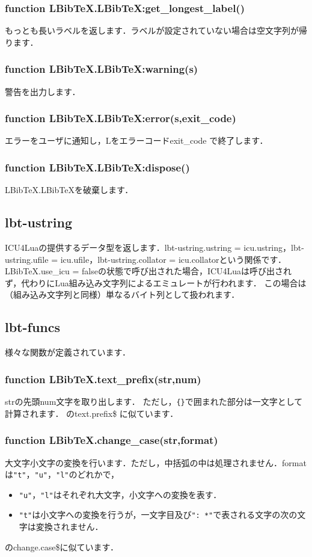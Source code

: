 \documentclass[dvipdfmx,a4paper]{jsarticle}
\DeclareRobustCommand{\LBibTeX}{L\BibTeX}
\begin{document}
\subsubsection{function LBibTeX.LBibTeX:get\_longest\_label()}
もっとも長いラベルを返します．ラベルが設定されていない場合は空文字列が帰ります．

\subsubsection{function LBibTeX.LBibTeX:warning(s)}
警告を出力します．

\subsubsection{function LBibTeX.LBibTeX:error(s,exit\_code)}
エラーをユーザに通知し，\LBibTeX をエラーコードexit\_code で終了します．

\subsubsection{function LBibTeX.LBibTeX:dispose()}
LBibTeX.LBibTeXを破棄します．

\subsection{lbt-ustring}
ICU4Luaの提供するデータ型を返します．lbt-ustring.ustring = icu.ustring，lbt-ustring.ufile = icu.ufile，lbt-ustring.collator = icu.collatorという関係です．
LBibTeX.use\_icu = falseの状態で呼び出された場合，ICU4Luaは呼び出されず，代わりにLua組み込み文字列によるエミュレートが行われます．
この場合は（組み込み文字列と同様）単なるバイト列として扱われます．

\subsection{lbt-funcs}
様々な関数が定義されています．
\subsubsection{function LBibTeX.text\_prefix(str,num)}
strの先頭num文字を取り出します．
ただし，\verb|{}|で囲まれた部分は一文字として計算されます．
\BibTeX のtext.prefix\$ に似ています．

\subsubsection{function LBibTeX.change\_case(str,format)}
大文字小文字の変換を行います．ただし，中括弧の中は処理されません．formatは\verb|"t"|，\verb|"u"|，\verb|"l"|のどれかで，
\begin{itemize}
\item \verb|"u"|，\verb|"l"|はそれぞれ大文字，小文字への変換を表す．
\item \verb|"t"|は小文字への変換を行うが，一文字目及び\verb|": *"|で表される文字の次の文字は変換されません．
\end{itemize}
\BibTeX のchange.case\$に似ています．
\end{document}
